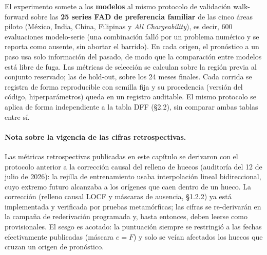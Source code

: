 \documentclass[12pt,letterpaper]{report}
\begin{document}
El experimento somete a los \textbf{\factNModels{} modelos} al mismo protocolo de validación
walk-forward sobre las \textbf{25 series FAD de preferencia familiar} de las cinco
áreas piloto (México, India, China, Filipinas y \textit{All Chargeability}), es
decir, 600 evaluaciones modelo-serie (una combinación falló por un problema numérico
y se reporta como ausente, sin abortar el barrido). En cada
origen, el pronóstico a un paso usa solo información del pasado, de modo que la
comparación entre modelos está libre de fuga. Las métricas de selección se calculan
sobre la región previa al conjunto reservado; las de hold-out, sobre los 24 meses
finales. Cada corrida se registra de forma reproducible con semilla fija y su
procedencia (versión del código, hiperparámetros) queda en un registro auditable. El
mismo protocolo se aplica de forma independiente a la tabla DFF (§2.2), sin comparar
ambas tablas entre sí.

\paragraph{Nota sobre la vigencia de las cifras retrospectivas.} Las métricas
retrospectivas publicadas en este capítulo se derivaron con el protocolo anterior a la
corrección causal del relleno de huecos (auditoría del 12 de julio de 2026): la rejilla
de entrenamiento usaba interpolación lineal bidireccional, cuyo extremo futuro
alcanzaba a los orígenes que caen dentro de un hueco. La corrección (relleno causal
LOCF y máscaras de ausencia, §1.2.2) ya está implementada y verificada por pruebas
metamórficas; las cifras se re-derivarán en la campaña de rederivación programada y,
hasta entonces, deben leerse como provisionales. El sesgo es acotado: la puntuación
siempre se restringió a las fechas efectivamente publicadas (máscara $e=F$) y solo se
veían afectados los huecos que cruzan un origen de pronóstico.
\end{document}
